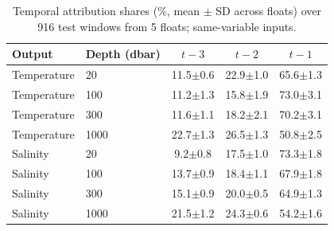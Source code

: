 \begin{table}[t]\centering\small
\caption{Temporal attribution shares (\%, mean $\pm$ SD across floats) over 916 test windows from 5 floats; same-variable inputs.}\label{tab:attr}
\begin{tabular}{llccc}\toprule
Output & Depth (dbar) & $t{-}3$ & $t{-}2$ & $t{-}1$\\\midrule
Temperature & 20 & 11.5$\pm$0.6 & 22.9$\pm$1.0 & 65.6$\pm$1.3\\
Temperature & 100 & 11.2$\pm$1.3 & 15.8$\pm$1.9 & 73.0$\pm$3.1\\
Temperature & 300 & 11.6$\pm$1.1 & 18.2$\pm$2.1 & 70.2$\pm$3.1\\
Temperature & 1000 & 22.7$\pm$1.3 & 26.5$\pm$1.3 & 50.8$\pm$2.5\\
Salinity & 20 & 9.2$\pm$0.8 & 17.5$\pm$1.0 & 73.3$\pm$1.8\\
Salinity & 100 & 13.7$\pm$0.9 & 18.4$\pm$1.1 & 67.9$\pm$1.8\\
Salinity & 300 & 15.1$\pm$0.9 & 20.0$\pm$0.5 & 64.9$\pm$1.3\\
Salinity & 1000 & 21.5$\pm$1.2 & 24.3$\pm$0.6 & 54.2$\pm$1.6\\
\bottomrule\end{tabular}\end{table}
